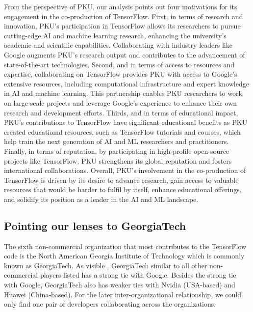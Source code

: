 \documentclass[CHICAGO,Times1COL]{WileyNJDv5} %
\begin{document}
From the perspective of PKU, our analysis points out four motivations for its engagement in the co-production of TensorFlow. First, in terms of research and innovation, PKU's participation in TensorFlow allows its researchers to pursue cutting-edge AI and machine learning research, enhancing the university's academic and scientific capabilities. Collaborating with industry leaders like Google augments PKU's research output and contributes to the advancement of state-of-the-art technologies. Second, and in terms of access to resources and expertise, collaborating on TensorFlow provides PKU with access to Google's extensive resources, including computational infrastructure and expert knowledge in AI and machine learning. This partnership enables PKU researchers to work on large-scale projects and leverage Google's experience to enhance their own research and development efforts. Thirds, and in terms of educational impact, PKU's contributions to TensorFlow have significant educational benefits as PKU created educational resources, such as TensorFlow tutorials and courses, which help train the next generation of \ac{AI} and \ac{ML} researchers and practitioners. Finally, in terms of reputation, by participating in high-profile open-source projects like TensorFlow, PKU strengthens its global reputation and fosters international collaborations.
Overall, PKU's involvement in the co-production of TensorFlow is driven by its desire to advance research, gain access to valuable resources that would be harder to fulfil by itself, enhance educational offerings, and solidify its position as a leader in the \ac{AI} and \ac{ML} landscape.

\subsection{Pointing our lenses to GeorgiaTech}


The sixth non-commercial organization that most contributes to the TensorFlow code is the North American Georgia Institute of Technology which is commonly known as GeorgiaTech.  As visible , GeorgiaTech similar to all other non-commercial players listed  has a strong tie with Google.  Besides the strong tie with Google, GeorgiaTech also has weaker ties with Nvidia (USA-based) and Huawei (China-based). For the later inter-organizational relationship, we could only find one pair of developers collaborating across the organizations. 
\end{document}
